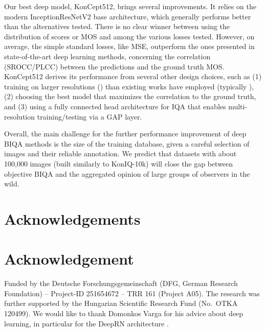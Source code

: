 \documentclass[10pt,journal,compsoc]{IEEEtran}
\begin{document}
Our best deep model, {KonCept512}, brings several improvements. It relies on the modern InceptionResNetV2 base architecture, which generally performs better than the alternatives tested. There is no clear winner between using the distribution of scores or MOS and among the various losses tested. However, on average, the simple standard losses, like MSE, outperform the ones presented in state-of-the-art deep learning methods, concerning the correlation (SROCC/PLCC) between the predictions and the ground truth MOS. {KonCept512} derives its performance from several other design choices, such as (1) training on larger resolutions () than existing works have employed (typically ), (2) choosing the best model that maximizes the correlation to the ground truth, and (3) using a fully connected head architecture for IQA that enables multi-resolution training/testing via a GAP layer.

Overall, the main challenge for the further performance improvement of deep BIQA methods is the size of the training database, given a careful selection of images and their reliable annotation. We predict that datasets with about 100,000 images (built similarly to KonIQ-10k) will close the gap between objective BIQA and the aggregated opinion of large groups of observers in the wild.





















\ifCLASSOPTIONcompsoc
\section*{Acknowledgements}
\else
\section*{Acknowledgement}
\fi
Funded by the Deutsche Forschungsgemeinschaft (DFG, German Research Foundation) -- Project-ID 251654672 -- TRR 161 (Project A05).
The research was further supported by the Hungarian Scientific Research Fund (No.\ OTKA 120499). We would like to thank Domonkos Varga for his advice about deep learning, in particular for the DeepRN architecture \cite{varga2018deeprn}.
 
\ifCLASSOPTIONcaptionsoff
  \newpage
\fi
\end{document}

